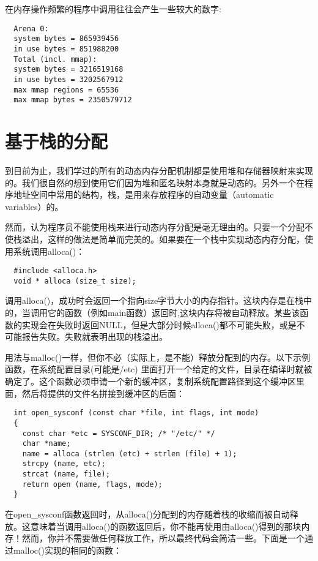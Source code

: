 在内存操作频繁的程序中调用往往会产生一些较大的数字: 

\begin{verbatim}
  Arena 0:
  system bytes = 865939456
  in use bytes = 851988200
  Total (incl. mmap):
  system bytes = 3216519168
  in use bytes = 3202567912
  max mmap regions = 65536
  max mmap bytes = 2350579712
\end{verbatim}

\section{基于栈的分配}

到目前为止，我们学过的所有的动态内存分配机制都是使用堆和存储器映射来实现的。我们很自然的想到使用它们因为堆和匿名映射本身就是动态的。另外一个在程序地址空间中常用的结构，栈，是用来存放程序的自动变量（automatic variables）的。

然而，认为程序员不能使用栈来进行动态内存分配是毫无理由的。只要一个分配不使栈溢出，这样的做法是简单而完美的。如果要在一个栈中实现动态内存分配，使用系统调用alloca()：

\begin{lstlisting}
  #include <alloca.h>
  void * alloca (size_t size);
\end{lstlisting}

调用alloca()，成功时会返回一个指向size字节大小的内存指针。这块内存是在栈中的，当调用它的函数（例如main函数）返回时,这块内存将被自动释放。某些该函数的实现会在失败时返回NULL，但是大部分时候alloca()都不可能失败，或是不可能报告失败。失败就表明出现的栈溢出。

用法与malloc()一样，但你不必（实际上，是不能）释放分配到的内存。以下示例函数，在系统配置目录(可能是/etc) 里面打开一个给定的文件，目录在编译时就被确定了。这个函数必须申请一个新的缓冲区，复制系统配置路径到这个缓冲区里面，然后将提供的文件名拼接到缓冲区的后面： 

\begin{lstlisting}
  int open_sysconf (const char *file, int flags, int mode)
  {
    const char *etc = SYSCONF_DIR; /* "/etc/" */
    char *name;
    name = alloca (strlen (etc) + strlen (file) + 1);
    strcpy (name, etc);
    strcat (name, file);
    return open (name, flags, mode);
  }
\end{lstlisting}

在open\_sysconf函数返回时，从alloca()分配到的内存随着栈的收缩而被自动释放。这意味着当调用alloca()的函数返回后，你不能再使用由alloca()得到的那块内存！然而，你并不需要做任何释放工作，所以最终代码会简洁一些。下面是一个通过malloc()实现的相同的函数： 

